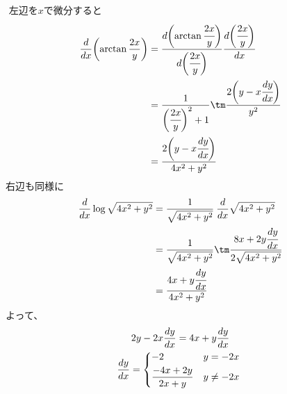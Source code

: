 \begin{ans*}
  ${}$
  左辺を$x$で微分すると
  \begin{align}
    \frac{d}{dx}\biggl(\arctan\frac{2x}{y}\biggr)
    &= \frac{d\biggl(\arctan\cfrac{2x}{y}\biggr)}{d\biggl(\cfrac{2x}{y}\biggr)} \frac{d\biggl(\cfrac{2x}{y}\biggr)}{dx} \\
    &= \frac{1}{\biggl(\cfrac{2x}{y}\biggr)^2 + 1}
    \tm \frac{2\biggl(y - x\cfrac{dy}{dx}\biggr)}{y^2} \\
    &= \frac{2\biggl(y-x\cfrac{dy}{dx}\biggr)}{4x^2+y^2}
  \end{align}
  右辺も同様に
  \begin{align}
    \frac{d}{dx}\log\sqrt{4x^2+y^2}
    &= \frac{1}{\sqrt{4x^2+y^2}}\:\frac{d}{dx}\sqrt{4x^2+y^2} \\
    &= \frac{1}{\sqrt{4x^2+y^2}}
    \tm \frac{8x + 2y \cfrac{dy}{dx}}{2\sqrt{4x^2+y^2}} \\
    &= \frac{4x + y\cfrac{dy}{dx}}{4x^2+y^2}
  \end{align}
  よって、
  \begin{gather}
    2y - 2x\frac{dy}{dx} = 4x + y\frac{dy}{dx} \\
    \frac{dy}{dx} =
    \begin{dcases*}
      -2 & $y = -2x$ \\
      \frac{-4x+2y}{2x+y} & $y \neq -2x$ \\
    \end{dcases*}
  \end{gather}
\end{ans*}


